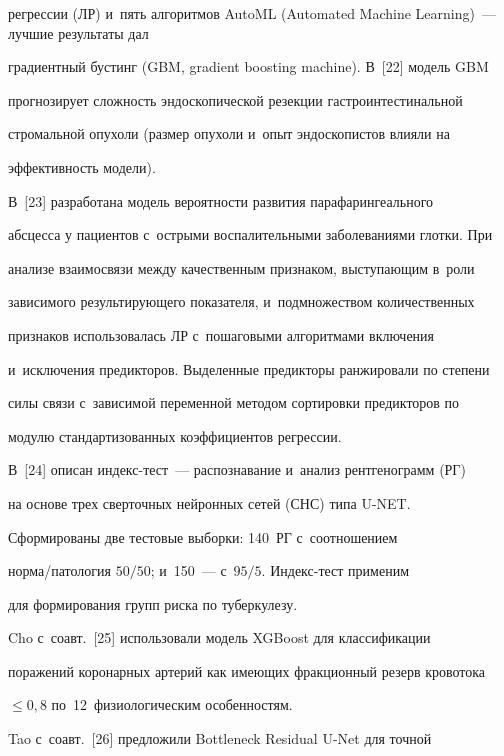 регрессии (ЛР) и~пять алгоритмов AutoML (Automated Machine Learning)~--- лучшие результаты дал 

градиентный бустинг (GBM,  gradient boosting machine). В~[22] модель GBM 

прогнозирует сложность эндоскопической резекции гастроинтестинальной 

стромальной опухоли (размер опухоли и~опыт эндоскопистов влияли на 

эффективность модели).

  

  В~[23] разработана модель вероятности развития парафарингеального 

абсцесса у пациентов с~острыми воспалительными заболеваниями глотки. При 

анализе взаимосвязи между качественным признаком, выступающим в~роли 

зависимого результирующего показателя, и~подмножеством количественных 

признаков использовалась ЛР с~пошаговыми алгоритмами включения 

и~исключения предикторов. Выделенные предикторы ранжировали по степени 

силы связи с~зависимой переменной методом сортировки предикторов по 

модулю стандартизованных коэффициентов регрессии. 

  

  В~[24] описан индекс-тест~--- распознавание и~анализ рентгенограмм (РГ) 

на основе трех сверточных нейронных сетей (СНС) типа U-NET. 

Сформированы две тестовые выборки: 140~РГ с~соотношением  

нор\-ма\!/\!па\-то\-ло\-гия $50/50$; и~150~--- с~$95/5$. Индекс-тест применим 

для формирования групп риска по туберкулезу.

{



}

  

  Cho с~соавт.~[25] использовали модель XGBoost для классификации 

поражений коронарных артерий как имеющих фракционный резерв кровотока 

$\leq0{,}8$ по~12~физиологическим особенностям. 

  

  Tao с~соавт.~[26] предложили Bottleneck Residual U-Net для точной 

